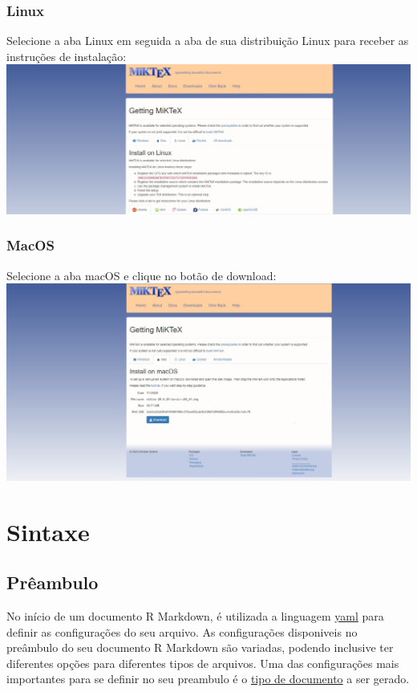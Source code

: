 \documentclass[
]{book}
\begin{document}
\hypertarget{linux}{%
\subsection{Linux}\label{linux}}

Selecione a aba Linux em seguida a aba de sua distribuição Linux para receber as instruções de instalação:
\includegraphics{img/download_linux_MiKTex.jpg}

\hypertarget{macos}{%
\subsection{MacOS}\label{macos}}

Selecione a aba macOS e clique no botão de download:
\includegraphics{img/download_macOS_MiKTex.jpg}

\hypertarget{sintaxe}{%
\chapter{Sintaxe}\label{sintaxe}}

\hypertarget{pruxeaambulo}{%
\section{Prêambulo}\label{pruxeaambulo}}

No início de um documento R Markdown, é utilizada a linguagem \href{https://pt.wikipedia.org/wiki/YAML}{yaml} para definir as configurações do seu arquivo.
As configurações disponiveis no preâmbulo do seu documento R Markdown são variadas, podendo inclusive ter diferentes opções para diferentes tipos de arquivos.
Uma das configurações mais importantes para se definir no seu preambulo é o \protect\hyperlink{possuxedveis-tipos-de-outputs}{tipo de documento} a ser gerado.
\end{document}
